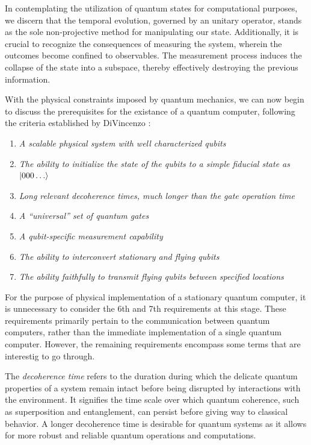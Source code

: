 \documentclass[
  journal=largetwo,
  year=2023,
]{cup-journal}
\begin{document}
\noindent In contemplating the utilization of quantum states for computational purposes, we discern that the temporal evolution, governed by an unitary operator, stands as the sole non-projective method for manipulating our state. Additionally, it is crucial to recognize the consequences of measuring the system, wherein the outcomes become confined to observables. The measurement process induces the collapse of the state into a subspace, thereby effectively destroying the previous information.

With the physical constraints imposed by quantum mechanics, we can now begin to discuss the prerequisites for the existance of a quantum computer, following the criteria established by DiVincenzo \autocite{divincenzo_2000_the}:

\begin{enumerate}
  \item \emph{A scalable physical system with well characterized qubits}
  \item \emph{The ability to initialize the state of the qubits to a simple fiducial state as \(\ket{000\dots}\)}
  \item \emph{Long relevant decoherence times, much longer than the gate operation time}
  \item \emph{A “universal” set of quantum gates}
  \item \emph{A qubit-specific measurement capability}
  \item \emph{The ability to interconvert stationary and flying qubits}
  \item \emph{The ability faithfully to transmit flying qubits between specified locations}
\end{enumerate}

For the purpose of physical implementation of a stationary quantum computer, it is unnecessary to consider the 6th and 7th requirements at this stage. These requirements primarily pertain to the communication between quantum computers, rather than the immediate implementation of a single quantum computer. However, the remaining requirements encompass some terms that are interestig to go through.

The { \it decoherence time } refers to the duration during which the delicate quantum properties of a system remain intact before being disrupted by interactions with the environment. It signifies the time scale over which quantum coherence, such as superposition and entanglement, can persist before giving way to classical behavior. A longer decoherence time is desirable for quantum systems as it allows for more robust and reliable quantum operations and computations.
\end{document}
